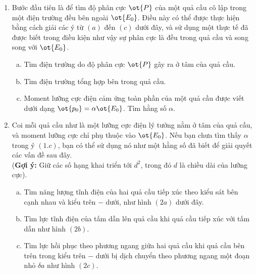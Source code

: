 \begin{vd}
\begin{center}

\end{center}
\begin{enumerate}[1)]
    \item Bước đầu tiên là để tìm độ phân cực $\ot{P}$ của một quả cầu cô lập trong một điện trường đều bên ngoài $\ot{E_0}$. Điều này có thể được thực hiện bằng cách giải các ý từ $(a)$ đến $(c)$ dưới đây, và sử dụng một thực tế đã được biết trong điều kiện như vậy sự phân cực là đều trong quả cầu và song song với $\ot{E_0}$.
    \begin{enumerate}[a)]
        \item Tìm điện trường do độ phân cực $\ot{P}$ gây ra ở tâm của quả cầu.
        \item Tìm điện trường tổng hợp bên trong quả cầu.
        \item Moment lưỡng cực điện cảm ứng toàn phần của một quả cầu được viết dưới dạng $\ot{p_0}=\alpha \ot{E_0}$. Tìm hằng số $\alpha$.
    \end{enumerate}
    \item Coi mỗi quả cầu như là một lưỡng cực điện lý tưởng nằm ở tâm của quả cầu, và moment lưỡng cực chỉ phụ thuộc vào $\ot{E_0}$. Nếu bạn chưa tìm thấy $\alpha$ trong ý $(1.c)$, bạn có thể sử dụng nó như một hằng số đã biết để giải quyết các vấn đề sau đây.\\ 
    (\textbf{Gợi ý:} Giữ các số hạng khai triển tới $d^2$, trong đó $d$ là chiều dài của lưỡng cực).
    \begin{enumerate}[a)]
        \item Tìm năng lượng tĩnh điện của hai quả cầu tiếp xúc theo kiểu sát bên cạnh nhau và kiểu trên $-$ dưới, như hình $(2a)$ dưới đây.
        \item Tìm lực tĩnh điện của tấm dẫn lên quả cầu khi quả cầu tiếp xúc với tấm dẫn như hình $(2b)$.
        \item Tìm lực hồi phục theo phương ngang giữa hai quả cầu khi quả cầu bên trên trong kiểu trên $-$ dưới bị dịch chuyển theo phương ngang một đoạn nhỏ $\delta a$ như hình $(2c)$.
    \end{enumerate}
    \end{enumerate}
\begin{center}
    



\end{center}
\end{vd}
